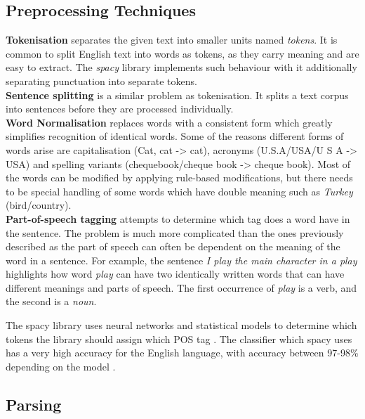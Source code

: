 \subsection{Preprocessing Techniques}

\textbf{Tokenisation} separates the given text into smaller units named \emph{tokens}. 
It is common to split English text into words as tokens, as they carry meaning and are easy to extract.
The \emph{spacy} library implements such behaviour with it additionally separating punctuation into separate tokens.\\

\textbf{Sentence splitting} is a similar problem as tokenisation. It splits a text corpus into sentences before they are processed individually. \\

\textbf{Word Normalisation} replaces words with a consistent form which greatly simplifies recognition of identical words.
Some of the reasons different forms of words arise are capitalisation (Cat, cat -> cat), acronyms (U.S.A/USA/U S A -> USA) and spelling variants (chequebook/cheque book -> cheque book). 
Most of the words can be modified by applying rule-based modifications, but there needs to be special handling of some words which have double meaning such as \emph{Turkey} (bird/country). \\


\textbf{Part-of-speech tagging} attempts to determine which tag does a word have in the sentence.
The problem is much more complicated than the ones previously described as the part of speech can often be dependent on the meaning of the word in a sentence.
For example, the sentence \emph{I play the main character in a play} highlights how word \emph{play} can have two identically written words that can have different meanings and parts of speech.
The first occurrence of \emph{play} is a verb, and the second is a \emph{noun}.

The spacy library uses neural networks and statistical models to determine which tokens the library should assign which POS tag \cite{RefWorks:RefID:25-spacy}.
The classifier which spacy uses has a very high accuracy for the English language, with accuracy between 97-98\% depending on the model \cite{RefWorks:RefID:26-spacy}.



\subsection{Parsing}

